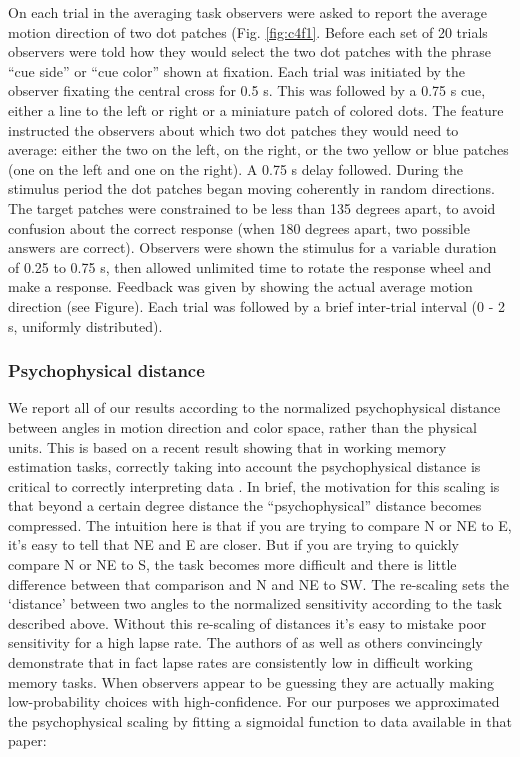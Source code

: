 On each trial in the averaging task observers were asked to report the average motion direction of two dot patches (Fig. \ref{fig:c4f1}. Before each set of 20 trials observers were told how they would select the two dot patches with the phrase ``cue side'' or ``cue color'' shown at fixation. Each trial was initiated by the observer fixating the central cross for 0.5 s. This was followed by a 0.75 s cue, either a line to the left or right or a miniature patch of colored dots. The feature instructed the observers about which two dot patches they would need to average: either the two on the left, on the right, or the two yellow or blue patches (one on the left and one on the right). A 0.75 s delay followed. During the stimulus period the dot patches began moving coherently in random directions. The target patches were constrained to be less than 135 degrees apart, to avoid confusion about the correct response (when 180 degrees apart, two possible answers are correct). Observers were shown the stimulus for a variable duration of 0.25 to 0.75 s, then allowed unlimited time to rotate the response wheel and make a response. Feedback was given by showing the actual average motion direction (see Figure). Each trial was followed by a brief inter-trial interval (0 - 2 s, uniformly distributed).

\subsubsection{Psychophysical distance}

We report all of our results according to the normalized psychophysical distance between angles in motion direction and color space, rather than the physical units. This is based on a recent result showing that in working memory estimation tasks, correctly taking into account the psychophysical distance is critical to correctly interpreting data \citep{Schurgin2018-vi}. In brief, the motivation for this scaling is that beyond a certain degree distance the ``psychophysical'' distance becomes compressed. The intuition here is that if you are trying to compare N or NE to E, it's easy to tell that NE and E are closer. But if you are trying to quickly compare N or NE to S, the task becomes more difficult and there is little difference between that comparison and N and NE to SW. The re-scaling sets the `distance' between two angles to the normalized sensitivity according to the task described above. Without this re-scaling of distances it's easy to mistake poor sensitivity for a high lapse rate. The authors of \citet{Schurgin2018-vi} as well as others \citep{Bays2014-ym} convincingly demonstrate that in fact lapse rates are consistently low in difficult working memory tasks. When observers appear to be guessing they are actually making low-probability choices with high-confidence. For our purposes we approximated the psychophysical scaling by fitting a sigmoidal function to data available in that paper: 

